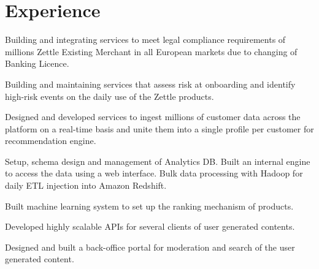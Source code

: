 \documentclass[]{rajnikant-resume-openfont}
\begin{document}
\begin{minipage}[t]{0.66\textwidth} 


\section{Experience}

\begin{tightemize}

\item  {} Building and integrating services to meet legal compliance requirements of ​millions ​Zettle​ ​Existing Merchant in all European markets due to changing of Banking Licence.  
\item  {} Building and maintaining services that assess risk at onboarding and identify high-risk events on the daily use of the Zettle products.
\end{tightemize}
\sectionsep

\begin{tightemize}
\item {}  Designed and developed services to ingest millions of customer data across the platform on a
real-time basis and unite them into a single profile per customer for recommendation engine.
\item {} Setup, schema design and management of Analytics DB. Built an internal engine to
access the data using a web interface. Bulk data processing with Hadoop for daily ETL injection into Amazon Redshift.

\end{tightemize}
\sectionsep


\begin{tightemize}
\item Built machine learning system to set up the ranking mechanism of products. 
\item Developed highly scalable APIs for several clients of user generated contents.
\item Designed and built a back-office portal for moderation  and search of the user generated content.
\end{tightemize}
\sectionsep


\end{minipage}
\end{document}
